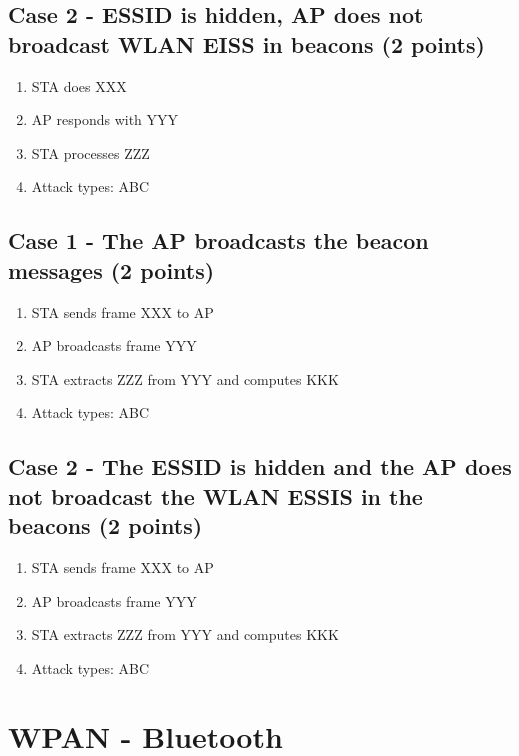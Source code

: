 \begin{questions}
\subsection*{Case 2 - ESSID is hidden, AP does not broadcast WLAN EISS in beacons (2 points)}
\begin{enumerate}
    \item STA does XXX
    \item AP responds with YYY
    \item STA processes ZZZ
    \item Attack types: ABC
\end{enumerate}


\subsection*{Case 1 - The AP broadcasts the beacon messages (2 points)}
\begin{enumerate}
    \item STA sends frame XXX to AP
    \item AP broadcasts frame YYY
    \item STA extracts ZZZ from YYY and computes KKK
    \item Attack types: ABC
\end{enumerate}

\subsection*{Case 2 - The ESSID is hidden and the AP does not broadcast the WLAN ESSIS in the beacons (2 points)}
\begin{enumerate}
    \item STA sends frame XXX to AP
    \item AP broadcasts frame YYY
    \item STA extracts ZZZ from YYY and computes KKK
    \item Attack types: ABC
\end{enumerate}

\section{WPAN - Bluetooth}



\end{questions}
